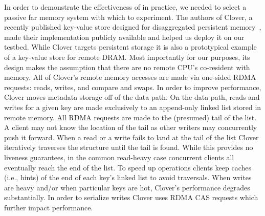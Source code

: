 In order to demonstrate the effectiveness of {\sword} in practice, we
needed to select a passive far memory system with which to experiment.
The authors of Clover, a recently published key-value store designed
for disaggregated persistent memory~\cite{clover}, made their
implementation publicly available and helped us deploy it on our
testbed. While Clover targets persistent storage it is also a
prototypical example of a key-value store for remote DRAM.  Most
importantly for our purposes, its design makes the assumption that
there are no remote CPU's co-resident with memory. All of Clover's
remote memory accesses are made via one-sided RDMA requests: reads,
writes, and compare and swaps.  In order to improve performance,
Clover moves metadata storage off of the data path. On the data path,
reads and writes for a given key are made exclusively to an
append-only linked list stored in remote memory. All RDMA requests are
made to the (presumed) tail of the list. A client may not know the
location of the tail as other writers may concurrently push it
forward.  When a read or a write fails to land at the tail of the list
Clover iteratively traverses the structure until the tail is
found. While this provides no liveness guarantees, in the common
read-heavy case concurrent clients all eventually reach the end of the
list. To speed up operations clients keep caches (i.e., hints) of the
end of each key's linked list to avoid traversals. When writes are
heavy and/or when particular keys are hot, Clover's performance
degrades substantially. In order to serialize writes Clover uses RDMA CAS
requests which further impact performance.

